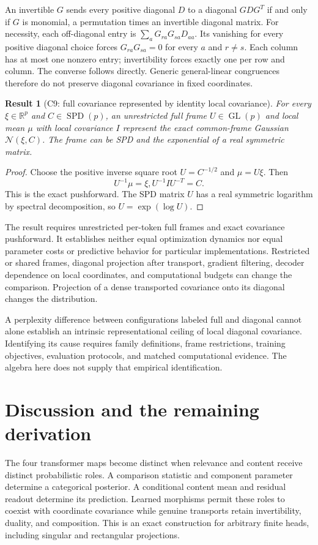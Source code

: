 \documentclass[11pt]{article}
\newtheorem{result}{Result}
\newcommand{\R}{\mathbb{R}}
\newcommand{\SPD}{\operatorname{SPD}}
\newcommand{\GL}{\operatorname{GL}}
\begin{document}
An invertible $G$ sends every positive diagonal $D$ to a diagonal $GDG^T$ if and only if $G$ is monomial, a permutation times an invertible diagonal matrix. For necessity, each off-diagonal entry is $\sum_aG_{ra}G_{sa}D_{aa}$. Its vanishing for every positive diagonal choice forces $G_{ra}G_{sa}=0$ for every $a$ and $r\ne s$. Each column has at most one nonzero entry; invertibility forces exactly one per row and column. The converse follows directly. Generic general-linear congruences therefore do not preserve diagonal covariance in fixed coordinates.

\begin{result}[C9: full covariance represented by identity local covariance]
\label{res:C9}
For every $\xi\in\R^p$ and $C\in\SPD(p)$, an unrestricted full frame $U\in\GL(p)$ and local mean $\mu$ with local covariance $I$ represent the exact common-frame Gaussian $\mathcal N(\xi,C)$. The frame can be SPD and the exponential of a real symmetric matrix.
\end{result}
\begin{proof}
Choose the positive inverse square root $U=C^{-1/2}$ and $\mu=U\xi$. Then
\begin{equation}
U^{-1}\mu=\xi, U^{-1}IU^{-T}=C.
\end{equation}
This is the exact pushforward. The SPD matrix $U$ has a real symmetric logarithm by spectral decomposition, so $U=\exp(\log U)$.
\end{proof}

The result requires unrestricted per-token full frames and exact covariance pushforward. It establishes neither equal optimization dynamics nor equal parameter costs or predictive behavior for particular implementations. Restricted or shared frames, diagonal projection after transport, gradient filtering, decoder dependence on local coordinates, and computational budgets can change the comparison. Projection of a dense transported covariance onto its diagonal changes the distribution.

A perplexity difference between configurations labeled full and diagonal cannot alone establish an intrinsic representational ceiling of local diagonal covariance. Identifying its cause requires family definitions, frame restrictions, training objectives, evaluation protocols, and matched computational evidence. The algebra here does not supply that empirical identification.

\section{Discussion and the remaining derivation}
\label{sec:discussion}
The four transformer maps become distinct when relevance and content receive distinct probabilistic roles. A comparison statistic and component parameter determine a categorical posterior. A conditional content mean and residual readout determine its prediction. Learned morphisms permit these roles to coexist with coordinate covariance while genuine transports retain invertibility, duality, and composition. This is an exact construction for arbitrary finite heads, including singular and rectangular projections.
\end{document}

